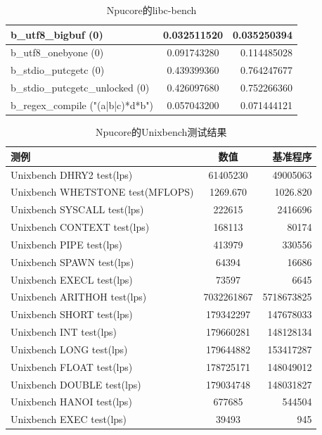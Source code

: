 \begin{table}[H]
\begin{tabular}{|l|c|r|}
        \hline
        b\_utf8\_bigbuf (0) & 0.032511520 &0.035250394\\
        \hline
        b\_utf8\_onebyone (0) & 0.091743280 &0.114485028\\
        \hline
        b\_stdio\_putcgetc (0) & 0.439399360 &0.764247677\\
        \hline
        b\_stdio\_putcgetc\_unlocked (0) & 0.426097680 &0.752266360\\
        \hline
        b\_regex\_compile ("(a|b|c)*d*b") & 0.057043200 &0.071444121\\
        \hline
    \end{tabular}
    \caption{Npucore的libc-bench}
\end{table}

\begin{table}[H]
    \centering
    \begin{tabular}{|l|c|r|}
        \hline
        \textbf{测例} & \textbf{数值} &\textbf{基准程序}\\
        \hline
        Unixbench DHRY2 test(lps) & 61405230 &49005063\\
        \hline
        Unixbench WHETSTONE test(MFLOPS) & 1269.670 &1026.820\\
        \hline
        Unixbench SYSCALL test(lps) & 222615 &2416696\\
        \hline
        Unixbench CONTEXT test(lps) & 168113 &80174\\
        \hline
        Unixbench PIPE test(lps) & 413979 &330556\\
        \hline
        Unixbench SPAWN test(lps) & 64394 &16686\\
        \hline
        Unixbench EXECL test(lps) & 73597 &6645\\
        \hline
        Unixbench ARITHOH test(lps) & 7032261867 &5718673825\\
        \hline
        Unixbench SHORT test(lps) & 179342297 &147678033\\
        \hline
        Unixbench INT test(lps) & 179660281 &148128134\\
        \hline
        Unixbench LONG test(lps) & 179644882 &153417287\\
        \hline
        Unixbench FLOAT test(lps) & 178725171 &148049012\\
        \hline
        Unixbench DOUBLE test(lps) & 179034748 &148031827\\
        \hline
        Unixbench HANOI test(lps) & 677685 &544504\\
        \hline
        Unixbench EXEC test(lps) & 39493 &945\\
        \hline
    \end{tabular}
    \caption{Npucore的Unixbench测试结果}
    \label{Npucore的Unixbench测试结果}
\end{table}
